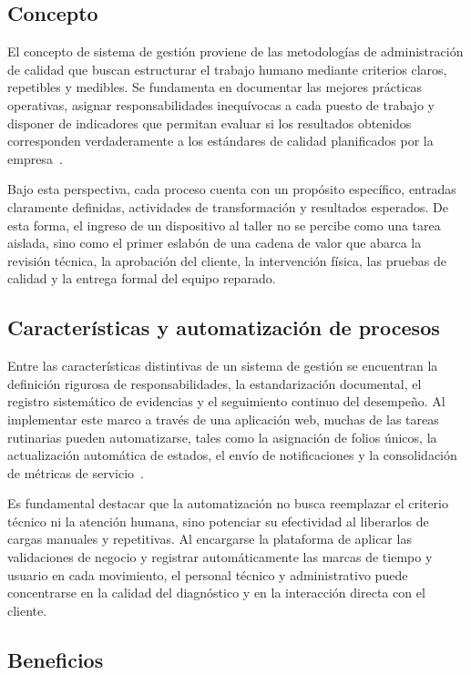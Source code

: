 \subsection{Concepto}

El concepto de sistema de gestión proviene de las metodologías de administración de calidad que buscan estructurar el trabajo humano mediante criterios claros, repetibles y medibles. Se fundamenta en documentar las mejores prácticas operativas, asignar responsabilidades inequívocas a cada puesto de trabajo y disponer de indicadores que permitan evaluar si los resultados obtenidos corresponden verdaderamente a los estándares de calidad planificados por la empresa~\cite{iso9001_2015}.

Bajo esta perspectiva, cada proceso cuenta con un propósito específico, entradas claramente definidas, actividades de transformación y resultados esperados. De esta forma, el ingreso de un dispositivo al taller no se percibe como una tarea aislada, sino como el primer eslabón de una cadena de valor que abarca la revisión técnica, la aprobación del cliente, la intervención física, las pruebas de calidad y la entrega formal del equipo reparado.

\subsection{Características y automatización de procesos}

Entre las características distintivas de un sistema de gestión se encuentran la definición rigurosa de responsabilidades, la estandarización documental, el registro sistemático de evidencias y el seguimiento continuo del desempeño. Al implementar este marco a través de una aplicación web, muchas de las tareas rutinarias pueden automatizarse, tales como la asignación de folios únicos, la actualización automática de estados, el envío de notificaciones y la consolidación de métricas de servicio~\cite{laudon2020management, iso9001_2015}.

Es fundamental destacar que la automatización no busca reemplazar el criterio técnico ni la atención humana, sino potenciar su efectividad al liberarlos de cargas manuales y repetitivas. Al encargarse la plataforma de aplicar las validaciones de negocio y registrar automáticamente las marcas de tiempo y usuario en cada movimiento, el personal técnico y administrativo puede concentrarse en la calidad del diagnóstico y en la interacción directa con el cliente.

\subsection{Beneficios}

